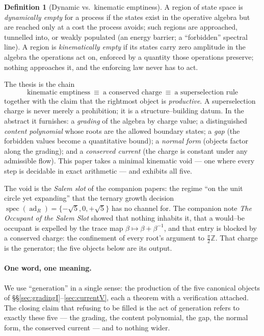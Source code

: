 \documentclass[11pt]{article}
\theoremstyle{plain}
\theoremstyle{definition}
\newtheorem{definition}[theorem]{Definition}
\theoremstyle{remark}
\newcommand{\Z}{\mathbb{Z}}
\newcommand{\spec}{\operatorname{spec}}
\newcommand{\ad}{\operatorname{ad}}
\begin{document}
\begin{definition}[Dynamic vs.\ kinematic emptiness]\label{def:two}
A region of state space is \emph{dynamically empty} for a process if the states exist in the operative algebra but are reached only at a cost the process avoids; such regions are approached, tunnelled into, or weakly populated (an energy barrier; a ``forbidden'' spectral line). A region is \emph{kinematically empty} if its states carry zero amplitude in the algebra the operations act on, enforced by a quantity those operations preserve; nothing approaches it, and the enforcing law never has to act.
\end{definition}

The thesis is the chain
\[
\boxed{\ \text{kinematic emptiness}\ \equiv\ \text{a conserved charge}\ \equiv\ \text{a superselection rule}\ }
\]
together with the claim that the rightmost object is \emph{productive}. A superselection charge is never merely a prohibition; it is a structure--building datum. In the abstract it furnishes: a \emph{grading} of the algebra by charge value; a distinguished \emph{content polynomial} whose roots are the allowed boundary states; a \emph{gap} (the forbidden values become a quantitative bound); a \emph{normal form} (objects factor along the grading); and a \emph{conserved current} (the charge is constant under any admissible flow). This paper takes a minimal kinematic void --- one where every step is decidable in exact arithmetic --- and exhibits all five.

The void is the \emph{Salem slot} of the companion papers: the regime ``on the unit circle yet expanding'' that the ternary growth decision $\spec(\ad_R)=\{-\sqrt5,0,+\sqrt5\}$ has no channel for. The companion note \emph{The Occupant of the Salem Slot} showed that nothing inhabits it, that a would--be occupant is expelled by the trace map $\beta\mapsto\beta+\beta^{-1}$, and that entry is blocked by a conserved charge: the confinement of every root's argument to $\tfrac\pi2\Z$. That charge is the generator; the five objects below are its output.

\paragraph{One word, one meaning.} We use ``generation'' in a single sense: the production of the five canonical objects of \S\S\ref{sec:gradingI}--\ref{sec:currentV}, each a theorem with a verification attached. The closing claim that refusing to be filled is the act of generation refers to exactly these five --- the grading, the content polynomial, the gap, the normal form, the conserved current --- and to nothing wider.
\end{document}
